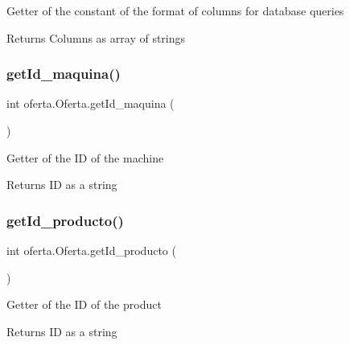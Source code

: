 Getter of the constant of the format of columns for database queries

\begin{DoxyReturn}{Returns}
Columns as array of strings 
\end{DoxyReturn}
\mbox{\label{classoferta_1_1_oferta_a1da8cf2d56690b843a8361c637352a23}} 
\subsubsection{\texorpdfstring{get\+Id\+\_\+maquina()}{getId\_maquina()}}
{\footnotesize\ttfamily int oferta.\+Oferta.\+get\+Id\+\_\+maquina (\begin{DoxyParamCaption}{ }\end{DoxyParamCaption})}

Getter of the ID of the machine

\begin{DoxyReturn}{Returns}
ID as a string 
\end{DoxyReturn}
\mbox{\label{classoferta_1_1_oferta_a61489be4622a79a222570257a4921243}} 
\subsubsection{\texorpdfstring{get\+Id\+\_\+producto()}{getId\_producto()}}
{\footnotesize\ttfamily int oferta.\+Oferta.\+get\+Id\+\_\+producto (\begin{DoxyParamCaption}{ }\end{DoxyParamCaption})}

Getter of the ID of the product

\begin{DoxyReturn}{Returns}
ID as a string 
\end{DoxyReturn}
\mbox{\label{classoferta_1_1_oferta_ab75e7ee84db370fdb8f5fcb4ea63e405}} 
